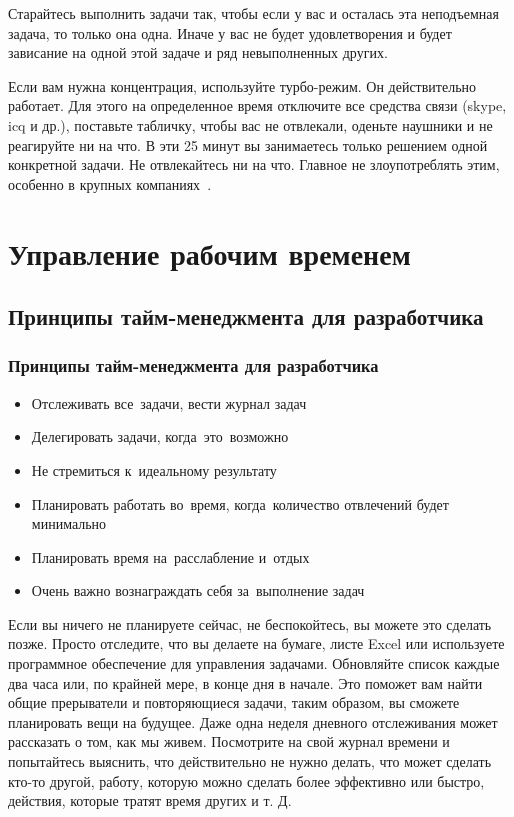 \documentclass{../industrial-development}
\begin{document}
Старайтесь выполнить задачи так, чтобы если у вас и осталась эта неподъемная задача, то только она одна. Иначе у вас не будет удовлетворения и будет зависание на одной этой задаче и ряд невыполненных других.

Если вам нужна концентрация, используйте турбо-режим. Он действительно работает. Для этого на определенное время отключите все средства связи (skype, icq и др.), поставьте табличку, чтобы вас не отвлекали, оденьте наушники и не реагируйте ни на что. В эти 25 минут вы занимаетесь только решением одной конкретной задачи. Не отвлекайтесь ни на что. Главное не злоупотреблять этим, особенно в крупных компаниях~\cite{TMHabr}.

\section{Управление рабочим временем}

\subsection{Принципы тайм-менеджмента для разработчика}

\begin{frame} \frametitle{Принципы тайм-менеджмента для разработчика}
  \begin{itemize}
  \item Отслеживать все~задачи, вести журнал задач
  \item Делегировать задачи, когда~это~возможно
  \item Не стремиться к~идеальному результату
  \item Планировать работать во~время, когда~количество отвлечений будет минимально
  \item Планировать время на~расслабление и~отдых
  \item Очень важно вознаграждать себя за~выполнение задач
  \end{itemize}
\end{frame}

\lecturenotes

Если вы ничего не планируете сейчас, не беспокойтесь, вы можете это сделать позже. Просто отследите, что вы делаете на бумаге, листе Excel или используете программное обеспечение для управления задачами. Обновляйте список каждые два часа или, по крайней мере, в конце дня в начале. Это поможет вам найти общие прерыватели и повторяющиеся задачи, таким образом, вы сможете планировать вещи на будущее. Даже одна неделя дневного отслеживания может рассказать о том, как мы живем.
Посмотрите на свой журнал времени и попытайтесь выяснить, что действительно не нужно делать, что может сделать кто-то другой, работу, которую можно сделать более эффективно или быстро, действия, которые тратят время других и т. Д.
\end{document}
